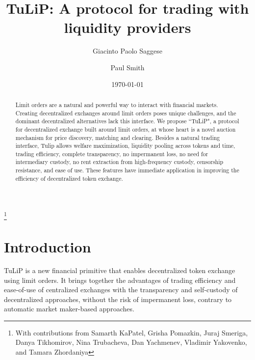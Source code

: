 \documentclass[11pt, reqno]{amsart}
\theoremstyle{definition}
\theoremstyle{remark}
\begin{document}
\title{TuLiP: A protocol for trading with liquidity providers}

\author{Giacinto Paolo Saggese}
\author{Paul Smith}

\thanks{With contributions from
	Samarth KaPatel,
	Grisha Pomazkin,
	Juraj Smeriga,
	Danya Tikhomirov,
	Nina Trubacheva,
	Dan Yachmenev,
	Vladimir Yakovenko,
	and
	Tamara Zhordaniya}

\date{\today}

\maketitle

\begin{abstract}
Limit orders are a natural and powerful way to interact with financial markets.
Creating decentralized exchanges around limit orders poses unique challenges,
and the dominant decentralized alternatives lack this interface.
We propose ``TuLiP", a protocol for decentralized exchange built around limit
orders, at whose heart is a novel auction mechanism for price discovery,
matching and clearing. Besides a natural trading interface, Tulip allows
welfare maximization, liquidity pooling across tokens and time, trading
efficiency, complete transparency, no impermanent loss, no need for
intermediary custody, no rent extraction from high-frequency custody,
censorship resistance, and ease of use. These features have immediate
application in improving the efficiency of decentralized token exchange.
\end{abstract}

\tableofcontents


\section{Introduction}

TuLiP is a new financial primitive that enables decentralized token
exchange using limit orders. It brings together the advantages of trading
efficiency and ease-of-use of centralized exchanges with the transparency and
self-custody of decentralized approaches, without the risk of impermanent loss,
contrary to automatic market maker-based approaches.
\end{document}
